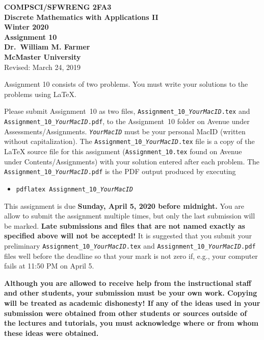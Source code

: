 \documentclass[11pt,fleqn]{article}
\begin{document}
\begin{center}

  {\large \textbf{COMPSCI/SFWRENG 2FA3}}\\[2mm]
  {\large \textbf{Discrete Mathematics with Applications II}}\\[2mm]
  {\large \textbf{Winter 2020}}\\[8mm]
  {\huge \textbf{Assignment 10}}\\[6mm]
  {\large \textbf{Dr.~William M. Farmer}}\\[2mm]
  {\large \textbf{McMaster University}}\\[6mm]
  {\large Revised: March 24, 2019}

\end{center}

\medskip

Assignment 10 consists of two problems.  You must write your solutions
to the problems using LaTeX.

Please submit Assignment~10 as two files,
\texttt{Assignment\_10\_\emph{YourMacID}.tex} and
\texttt{Assignment\_10\_\emph{YourMacID}.pdf}, to the Assignment~10
folder on Avenue under Assessments/Assignments.
\texttt{\emph{YourMacID}} must be your personal MacID (written without
capitalization).  The \texttt{Assignment\_10\_\emph{YourMacID}.tex}
file is a copy of the LaTeX source file for this assignment
(\texttt{Assignment\_10.tex} found on Avenue under
Contents/Assignments) with your solution entered after each problem.
The \texttt{Assignment\_10\_\emph{YourMacID}.pdf} is the PDF output
produced by executing

\begin{itemize}

  \item[] \texttt{pdflatex Assignment\_10\_\emph{YourMacID}}

\end{itemize}

This assignment is due \textbf{Sunday, April 5, 2020 before
  midnight.}  You are allow to submit the assignment multiple times,
but only the last submission will be marked.  \textbf{Late submissions
  and files that are not named exactly as specified above will not be
  accepted!}  It is suggested that you submit your preliminary
\texttt{Assignment\_10\_\emph{YourMacID}.tex} and
\texttt{Assignment\_10\_\emph{YourMacID}.pdf} files well before the
deadline so that your mark is not zero if, e.g., your computer fails
at 11:50 PM on April 5.

\textbf{Although you are allowed to receive help from the
  instructional staff and other students, your submission must be your
  own work.  Copying will be treated as academic dishonesty! If any of
  the ideas used in your submission were obtained from other students
  or sources outside of the lectures and tutorials, you must
  acknowledge where or from whom these ideas were obtained.}
\end{document}
